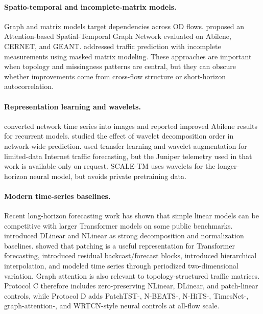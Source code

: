 \documentclass{article}
\begin{document}
\paragraph{Spatio-temporal and incomplete-matrix models.}
Graph and matrix models target dependencies across OD flows. \citet{peng2024astgn} proposed an Attention-based Spatial-Temporal Graph Network evaluated on Abilene, CERNET, and GEANT. \citet{zheng2024masked} addressed traffic prediction with incomplete measurements using masked matrix modeling. These approaches are important when topology and missingness patterns are central, but they can obscure whether improvements come from cross-flow structure or short-horizon autocorrelation.

\paragraph{Representation learning and wavelets.}
\citet{kablaoui2024images} converted network time series into images and reported improved Abilene results for recurrent models. \citet{hassanzada2026wavelet} studied the effect of wavelet decomposition order in network-wide prediction. \citet{saha2025limited} used transfer learning and wavelet augmentation for limited-data Internet traffic forecasting, but the Juniper telemetry used in that work is available only on request. SCALE-TM uses wavelets for the longer-horizon neural model, but avoids private pretraining data.

\paragraph{Modern time-series baselines.}
Recent long-horizon forecasting work has shown that simple linear models can be competitive with larger Transformer models on some public benchmarks. \citet{zeng2023transformers} introduced DLinear and NLinear as strong decomposition and normalization baselines. \citet{nie2023patchtst} showed that patching is a useful representation for Transformer forecasting, \citet{oreshkin2020nbeats} introduced residual backcast/forecast blocks, \citet{challu2023nhits} introduced hierarchical interpolation, and \citet{wu2023timesnet} modeled time series through periodized two-dimensional variation. Graph attention \citep{velickovic2018gat} is also relevant to topology-structured traffic matrices. Protocol C therefore includes zero-preserving NLinear, DLinear, and patch-linear controls, while Protocol D adds PatchTST-, N-BEATS-, N-HiTS-, TimesNet-, graph-attention-, and WRTCN-style neural controls at all-flow scale.
\end{document}
